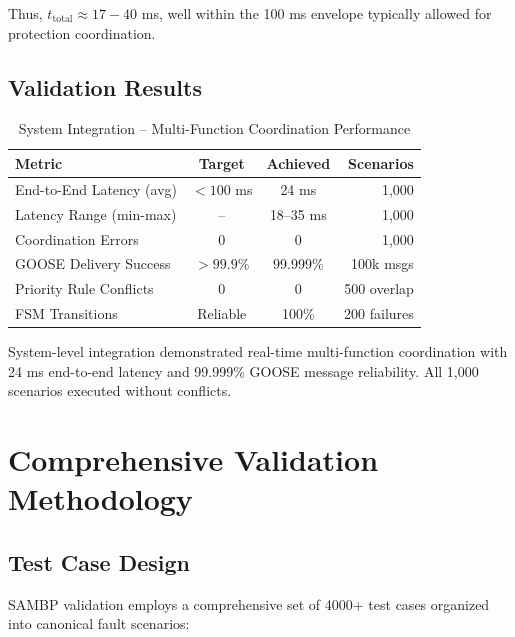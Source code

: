 \documentclass[12pt,a4paper]{article}
\begin{document}
Thus, $t_{\text{total}} \approx 17-40$ ms, well within the 100 ms envelope typically 
allowed for protection coordination.

\subsection{Validation Results}
\label{subsec:integration_results}

\begin{table}[H]
\centering
\caption{System Integration -- Multi-Function Coordination Performance}
\label{tab:integration_validation}
\begin{tabular}{lccr}
\toprule
\textbf{Metric} & \textbf{Target} & \textbf{Achieved} & \textbf{Scenarios} \\
\midrule
End-to-End Latency (avg) & $< 100$ ms & 24 ms & 1,000 \\
Latency Range (min-max) & -- & 18--35 ms & 1,000 \\
Coordination Errors & 0 & 0 & 1,000 \\
GOOSE Delivery Success & $>99.9\%$ & 99.999\% & 100k msgs \\
Priority Rule Conflicts & 0 & 0 & 500 overlap \\
FSM Transitions & Reliable & 100\% & 200 failures \\
\bottomrule
\end{tabular}
\end{table}

System-level integration demonstrated real-time multi-function coordination with 24 ms end-to-end latency and 99.999\% GOOSE message reliability. All 1,000 scenarios executed without conflicts.

\section{Comprehensive Validation Methodology}
\label{sec:validation}

\subsection{Test Case Design}
\label{subsec:test_design}

SAMBP validation employs a comprehensive set of 4000+ test cases organized into canonical 
fault scenarios:
\end{document}
